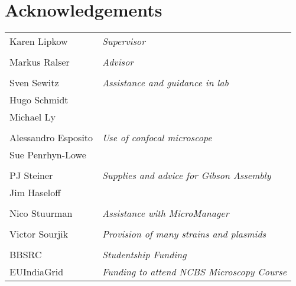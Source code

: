 \documentclass[../main.tex]{subfiles}
\begin{document}
\section*{Acknowledgements}

\begin{tabular}{p{5cm}l}
Karen Lipkow					&	\textit{Supervisor}\\&\\
Markus Ralser				&	\textit{Advisor}\\&\\
Sven Sewitz					& 	{\textit{Assistance and guidance in lab}}\\
Hugo Schmidt					&	\\
Michael Ly					&	\\&\\
Alessandro Esposito			&	{\textit{Use of confocal microscope}}\\
Sue Penrhyn-Lowe				&	\\&\\
PJ Steiner					&	{\textit{Supplies and advice for Gibson Assembly}}\\
Jim Haseloff					&	\\&\\
Nico Stuurman				&	\textit{Assistance with MicroManager}\\&\\
Victor Sourjik				&	\textit{Provision of many strains and plasmids}\\&\\
BBSRC						&	\textit{Studentship Funding}\\
EUIndiaGrid					&	\textit{Funding to attend NCBS Microscopy Course}
\end{tabular}
\end{document}
